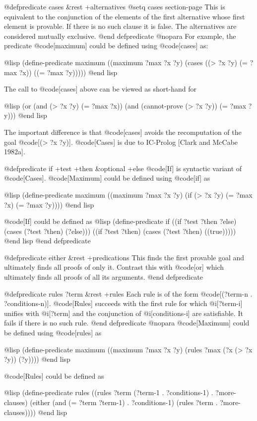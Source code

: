 {@defpredicate cases &rest +alternatives
@setq cases section-page
This is equivalent to the conjunction of the elements of the first alternative
whose first element is provable.
If there is no such clause it is false.
The alternatives are considered mutually exclusive.
@end defpredicate
@nopara
For example, the predicate @code[maximum] could be defined using @code[cases]
as:

@lisp
(define-predicate maximum
  ((maximum ?max ?x ?y)
   (cases ((> ?x ?y) (= ?max ?x))
          ((= ?max ?y)))))
@end lisp


The call to @code[cases] above can be viewed as short-hand for

@lisp
(or (and (> ?x ?y) (= ?max ?x))
    (and (cannot-prove (> ?x ?y)) (= ?max ?y)))
@end lisp

The important difference is that @code[cases] avoids the recomputation of the
goal @code[(> ?x ?y)].
@code[Cases] is due to IC-Prolog [Clark and McCabe 1982a].

@defpredicate if +test +then &optional +else
@code[If] is syntactic variant of @code[Cases].
@code[Maximum] could be defined using @code[if] as

@lisp
(define-predicate maximum
  ((maximum ?max ?x ?y)
   (if (> ?x ?y) (= ?max ?x) (= ?max ?y))))
@end lisp

@code[If] could be defined as
@lisp
(define-predicate if
  ((if ?test ?then ?else) (cases (?test ?then) (?else)))
  ((if ?test ?then) (cases (?test ?then) ((true)))))
@end lisp
@end defpredicate

@defpredicate either &rest +predications
This finds the first provable goal and ultimately finds all
proofs of only it.  Contrast this with @code[or] which ultimately finds all
proofs of all its arguments.
@end defpredicate

@defpredicate rules ?term &rest +rules
Each rule is of the form @code[(?term-n . ?conditions-n)].
@code[Rules] succeeds with
the first rule for which @i[?term-i] unifies with @i[?term] and the
conjunction of @i[conditions-i] are satisfiable.
It fails if there is no such rule.
@end defpredicate
@nopara
@code[Maximum] could be defined using @code[rules] as

@lisp
(define-predicate maximum
  ((maximum ?max ?x ?y)
   (rules ?max
          (?x (> ?x ?y))
          (?y))))
@end lisp


@code[Rules] could be defined as

@lisp
(define-predicate rules
  ((rules ?term (?term-1 . ?conditions-1) . ?more-clauses)
   (either (and (= ?term ?term-1) . ?conditions-1)
           (rules ?term . ?more-clauses))))
@end lisp

}
